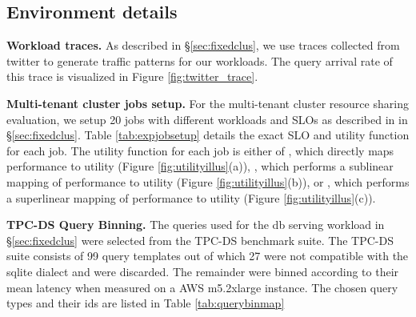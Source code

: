 \subsection{Environment details}



\textbf{Workload traces.} As described in \S\ref{sec:fixedclus}, we use traces collected from twitter to generate traffic patterns for our workloads. The query arrival rate of this trace is visualized in Figure \ref{fig:twitter_trace}.
\insertFigTwitterTrace

\textbf{Multi-tenant cluster jobs setup.} For the multi-tenant cluster resource sharing evaluation, we setup 20 jobs with different workloads and SLOs as described in in \S\ref{sec:fixedclus}. Table \ref{tab:expjobsetup} details the exact SLO and utility function for each job.  The utility function for each job is either of , which directly maps performance to utility (Figure \ref{fig:utilityillus}(a)), , which performs a sublinear mapping of performance to utility (Figure \ref{fig:utilityillus}(b)), or , which performs a superlinear mapping of performance to utility (Figure \ref{fig:utilityillus}(c)).
\insertExpSetupTable



\textbf{TPC-DS Query Binning.} The queries used for the db serving workload in \S\ref{sec:fixedclus} were selected from the TPC-DS benchmark suite. The TPC-DS suite consists of 99 query templates out of which 27 were not compatible with the sqlite dialect and were discarded. The remainder were binned according to their mean latency when measured on a AWS m5.2xlarge instance. The chosen query types and their ids are listed in Table \ref{tab:querybinmap}
\insertTableQueryBins


